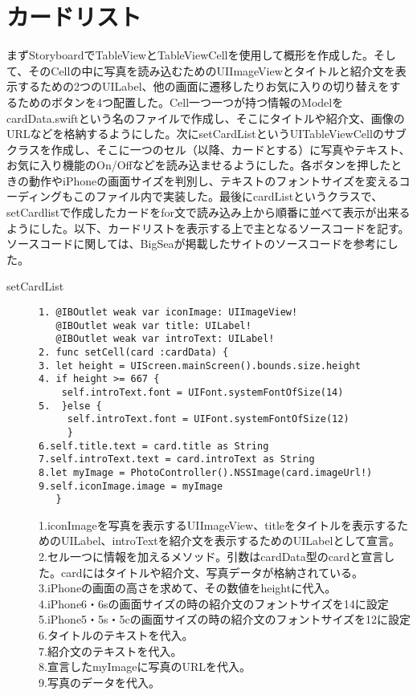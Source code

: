 \section{カードリスト}
まずStoryboardでTableViewとTableViewCellを使用して概形を作成した。そして、そのCellの中に写真を読み込むためのUIImageViewとタイトルと紹介文を表示するための2つのUILabel、他の画面に遷移したりお気に入りの切り替えをするためのボタンを4つ配置した。Cell一つ一つが持つ情報のModelをcardData.swiftという名のファイルで作成し、そこにタイトルや紹介文、画像のURLなどを格納するようにした。次にsetCardListというUITableViewCellのサブクラスを作成し、そこに一つのセル（以降、カードとする）に写真やテキスト、お気に入り機能のOn/Offなどを読み込ませるようにした。各ボタンを押したときの動作やiPhoneの画面サイズを判別し、テキストのフォントサイズを変えるコーディングもこのファイル内で実装した。最後にcardListというクラスで、setCardlistで作成したカードをfor文で読み込み上から順番に並べて表示が出来るようにした。以下、カードリストを表示する上で主となるソースコードを記す。ソースコードに関しては、BigSeaが掲載したサイトのソースコードを参考にした。

\begin{description}
\item[setCardList]\mbox{} 
\begin{lstlisting}[basicstyle=\ttfamily\footnotesize, frame=single]
1. @IBOutlet weak var iconImage: UIImageView!
   @IBOutlet weak var title: UILabel!
   @IBOutlet weak var introText: UILabel!
2. func setCell(card :cardData) {
3. let height = UIScreen.mainScreen().bounds.size.height
4. if height >= 667 {
    self.introText.font = UIFont.systemFontOfSize(14)
5.  }else {
     self.introText.font = UIFont.systemFontOfSize(12)
     }
6.self.title.text = card.title as String
7.self.introText.text = card.introText as String
8.let myImage = PhotoController().NSSImage(card.imageUrl!)
9.self.iconImage.image = myImage
   }
 \end{lstlisting}

1.iconImageを写真を表示するUIImageView、titleをタイトルを表示するためのUILabel、introTextを紹介文を表示するためのUILabelとして宣言。\\
2.セル一つに情報を加えるメソッド。引数はcardData型のcardと宣言した。cardにはタイトルや紹介文、写真データが格納されている。\\
3.iPhoneの画面の高さを求めて、その数値をheightに代入。\\
4.iPhone6・6sの画面サイズの時の紹介文のフォントサイズを14に設定 \\
5.iPhone5・5s・5cの画面サイズの時の紹介文のフォントサイズを12に設定 \\
6.タイトルのテキストを代入。 \\
7.紹介文のテキストを代入。 \\
8.宣言したmyImageに写真のURLを代入。 \\
9.写真のデータを代入。 \\
\end{description}

